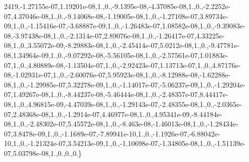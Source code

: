 \begin{DoxyCompactItemize}
2419,-\/1.\-27155e-\/07,1.\-19201e-\/08,1.,0.,-\/9.\-1395e-\/08,-\/4.\-37085e-\/08,1.,0.,-\/2.\-2252e-\/07,4.\-37046e-\/08,1.,0.,-\/9.\-14068e-\/08,-\/1.\-19005e-\/08,1.,0.,-\/1.\-27108e-\/07,3.\-89734e-\/09,1.,0.,-\/1.\-15416e-\/07,-\/3.\-68887e-\/09,1.,0.,-\/1.\-26483e-\/07,1.\-08582e-\/08,1.,0.,-\/9.\-39083e-\/08,-\/3.\-97438e-\/08,1.,0.,-\/2.\-1314e-\/07,2.\-89076e-\/08,1.,0.,-\/1.\-26417e-\/07,4.\-33225e-\/08,1.,0.,3.\-55072e-\/09,-\/8.\-29883e-\/08,1.,0.,-\/2.\-45414e-\/07,5.\-0212e-\/08,1.,0.,-\/9.\-47781e-\/08,1.\-34964e-\/09,1.,0.,-\/9.\-07292e-\/08,-\/5.\-56105e-\/08,1.,0.,-\/2.\-57561e-\/07,1.\-01883e-\/07,1.,0.,4.\-80889e-\/08,-\/1.\-13504e-\/07,1.,0.,-\/2.\-92423e-\/07,1.\-13713e-\/07,1.,0.,4.\-87176e-\/08,-\/1.\-02931e-\/07,1.,0.,-\/2.\-60076e-\/07,5.\-95923e-\/08,1.,0.,-\/8.\-12988e-\/08,-\/1.\-62288e-\/08,1.,0.,-\/1.\-29985e-\/07,5.\-32278e-\/09,1.,0.,-\/1.\-14017e-\/07,-\/5.\-06237e-\/09,1.,0.,-\/1.\-29204e-\/07,1.\-49267e-\/08,1.,0.,-\/8.\-44237e-\/08,-\/5.\-46444e-\/08,1.,0.,-\/2.\-48357e-\/07,8.\-44417e-\/08,1.,0.,4.\-96815e-\/09,-\/4.\-47039e-\/08,1.,0.,-\/1.\-29143e-\/07,-\/2.\-48355e-\/08,1.,0.,-\/2.\-0365e-\/07,2.\-48368e-\/08,1.,0.,-\/1.\-2914e-\/07,4.\-46977e-\/08,1.,0.,4.\-95341e-\/09,-\/8.\-44184e-\/08,1.,0.,-\/2.\-48302e-\/07,5.\-45572e-\/08,1.,0.,-\/8.\-463e-\/08,-\/1.\-46013e-\/08,1.,0.,-\/1.\-28434e-\/07,3.\-8478e-\/09,1.,0.,-\/1.\-1689e-\/07,-\/7.\-89941e-\/10,1.,0.,-\/1.\-1926e-\/07,-\/6.\-88042e-\/10,1.,0.,-\/1.\-21324e-\/07,3.\-54213e-\/09,1.,0.,-\/1.\-10698e-\/07,-\/1.\-34805e-\/08,1.,0.,-\/1.\-51139e-\/07,5.\-03798e-\/08,1.,0.,0.,0.\}
\end{DoxyCompactItemize}


